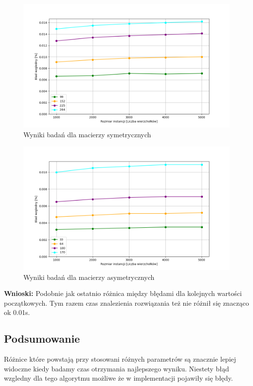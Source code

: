\documentclass{article}
\begin{document}
        \FloatBarrier
        
        \FloatBarrier
        \begin{figure}[ht]
          \centering
          \includegraphics[width=\textwidth]{src/plots/symAnStartTime.png}
          \caption{Wyniki badań dla macierzy symetrycznych}
          \label{fig:symStartT}
        \end{figure}
        \begin{figure}[ht]
          \centering
          \includegraphics[width=\textwidth]{src/plots/asymAnStartTime.png}
          \caption{Wyniki badań dla macierzy asymetrycznych}
          \label{fig:asymStartT}
        \end{figure}
        \FloatBarrier
        \textbf{Wnioski: } Podobnie jak ostatnio różnica między błędami dla kolejnych
        wartości początkowych. Tym razem czas znalezienia rozwiązania też nie różnił się
        znacząco ok 0.01s.        
      \subsection{Podsumowanie}
        Różnice które powstają przy stosowani różnych parametrów są znacznie lepiej widoczne 
        kiedy badamy czas otrzymania najlepszego wyniku. Niestety błąd wzgledny dla tego algorytmu
        możliwe że w implementacji pojawiły się błędy.
\end{document}
